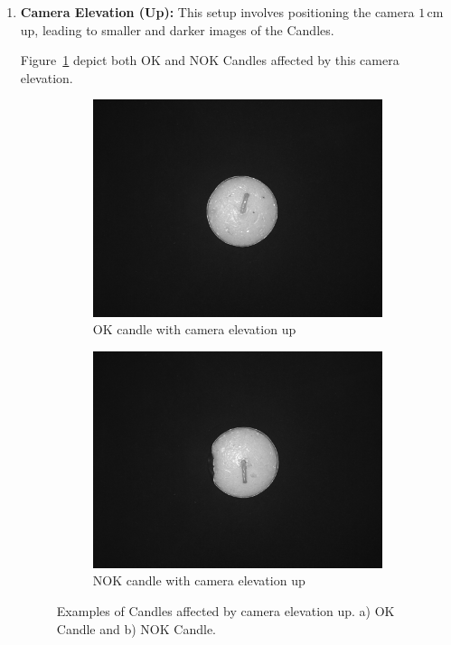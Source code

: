 \documentclass[12pt,DIV14,BCOR12mm,a4paper,footinclude=false,headinclude,parskip=half-,twoside,openright,cleardoublepage=empty,toc=index,bibliography=totoc,listof=totoc]{scrreprt}
\numberwithin{equation}{chapter}
\begin{document}
\begin{enumerate}
	\item \textbf{Camera Elevation (Up):} This setup involves positioning the camera $1\,\mathrm{cm}$ up, leading to smaller and darker images of the Candles. 

Figure~\ref{fig:camera_elevation_up} depict both OK and NOK Candles affected by this camera elevation.

	\begin{figure}
		\centering
		\begin{subfigure}[b]{0.45\textwidth}
			\centering
			\includegraphics[scale=0.15]{../media/Candles-influence-camera-up-OK.png}
			\caption{OK candle with camera elevation up}
		\end{subfigure}
		\hfill
		\begin{subfigure}[b]{0.45\textwidth}
			\centering
			\includegraphics[scale=0.15]{../media/Candles-influence-camera-up-NOK.png}
			\caption{NOK candle with camera elevation up}
		\end{subfigure}
		\caption{Examples of Candles affected by camera elevation up. a) OK Candle and b) NOK Candle.}
		\label{fig:camera_elevation_up}
	\end{figure}
\end{enumerate}
\end{document}
